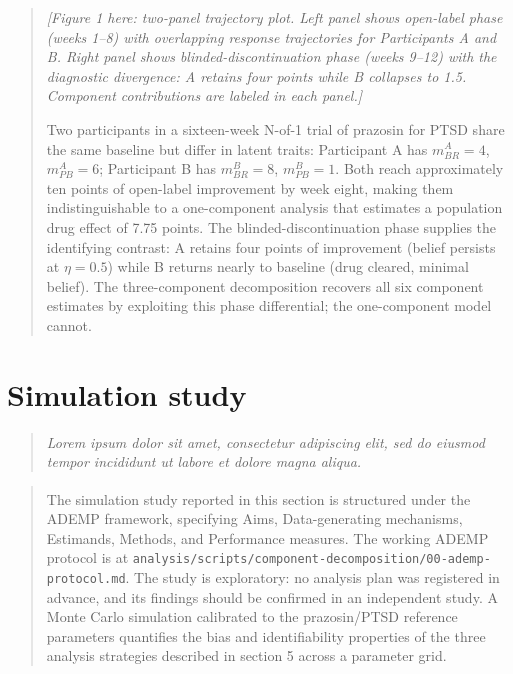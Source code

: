 \documentclass[
  11pt,
]{article}
\newenvironment{rgt}{%
  \begin{quote}\small\itshape\color[RGB]{20,60,160}}{%
  \end{quote}}
\newenvironment{orig}{%
  \begin{quote}\normalsize\color[gray]{0.55}}{%
  \end{quote}}
\begin{document}
\begin{orig}
\emph{{[}Figure 1 here: two-panel trajectory plot. Left panel shows
open-label phase (weeks 1--8) with overlapping response
trajectories for Participants A and B. Right panel shows
blinded-discontinuation phase (weeks 9--12) with the diagnostic
divergence: A retains four points while B collapses to 1.5.
Component contributions are labeled in each panel.{]}}

Two participants in a sixteen-week N-of-1 trial of prazosin for
PTSD share the same baseline but differ in latent traits:
Participant A has \(m_{BR}^A = 4\), \(m_{PB}^A = 6\); Participant B
has \(m_{BR}^B = 8\), \(m_{PB}^B = 1\). Both reach approximately
ten points of open-label improvement by week eight, making them
indistinguishable to a one-component analysis that estimates a
population drug effect of 7.75 points. The
blinded-discontinuation phase supplies the identifying contrast:
A retains four points of improvement (belief persists at
\(\eta = 0.5\)) while B returns nearly to baseline (drug cleared,
minimal belief). The three-component decomposition recovers all
six component estimates by exploiting this phase differential;
the one-component model cannot.

\end{orig}

\section{Simulation study}\label{simulation-study}

\begin{rgt}
Lorem ipsum dolor sit amet, consectetur adipiscing elit, sed do eiusmod tempor incididunt ut labore et dolore magna aliqua.

\end{rgt}

\begin{orig}
The simulation study reported in this section
is structured under the\textsuperscript{} ADEMP framework, specifying
Aims, Data-generating mechanisms, Estimands, Methods, and
Performance measures. The working ADEMP protocol is at
\texttt{analysis/scripts/component-decomposition/00-ademp-protocol.md}.
The study is exploratory: no analysis plan was registered in
advance, and its findings should be confirmed in an independent
study.
A Monte Carlo simulation calibrated to the prazosin/PTSD
reference parameters quantifies the bias and identifiability
properties of the three analysis strategies described in
section 5 across a parameter grid.

\end{orig}
\end{document}
